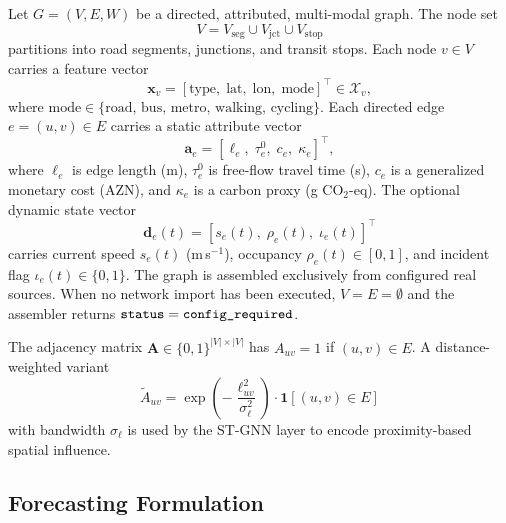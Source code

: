 Let $G = (V, E, W)$ be a directed, attributed, multi-modal graph.
The node set
\begin{equation}
  V = V_\mathrm{seg} \cup V_\mathrm{jct} \cup V_\mathrm{stop}
\end{equation}
partitions into road segments, junctions, and transit stops.
Each node $v \in V$ carries a feature vector
\begin{equation}
  \mathbf{x}_v = [\text{type},\; \text{lat},\; \text{lon},\;
                  \text{mode}]^\top \in \mathcal{X}_v,
\end{equation}
where $\text{mode} \in \{\text{road, bus, metro, walking, cycling}\}$.
Each directed edge $e = (u,v) \in E$ carries a static attribute vector
\begin{equation}
  \mathbf{a}_e = [\ell_e,\; \tau_e^0,\; c_e,\; \kappa_e]^\top,
\end{equation}
where $\ell_e$ is edge length (m), $\tau_e^0$ is free-flow travel time (s),
$c_e$ is a generalized monetary cost (AZN), and $\kappa_e$ is a carbon
proxy (g CO$_2$-eq).
The optional dynamic state vector
\begin{equation}
  \mathbf{d}_e(t) = [s_e(t),\; \rho_e(t),\; \iota_e(t)]^\top
\end{equation}
carries current speed $s_e(t)$ (m\,s$^{-1}$), occupancy $\rho_e(t) \in [0,1]$,
and incident flag $\iota_e(t) \in \{0,1\}$.
The graph is assembled exclusively from configured real sources.
When no network import has been executed, $V = E = \emptyset$ and the
assembler returns $\mathtt{status} = \texttt{config\_required}$.

The adjacency matrix $\mathbf{A} \in \{0,1\}^{|V|\times|V|}$ has
$A_{uv} = 1$ if $(u,v) \in E$.
A distance-weighted variant
\begin{equation}
  \tilde{A}_{uv} = \exp\!\left(-\frac{\ell_{uv}^2}{\sigma_\ell^2}\right)
  \cdot \mathbf{1}[(u,v)\in E]
  \label{eq:adj_weighted}
\end{equation}
with bandwidth $\sigma_\ell$ is used by the ST-GNN layer to encode
proximity-based spatial influence.

\subsection{Forecasting Formulation}


